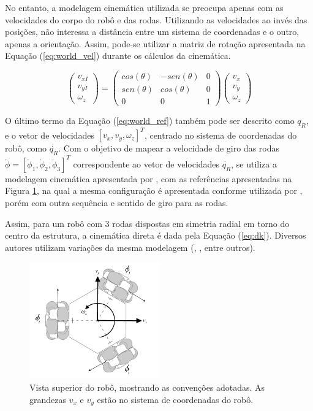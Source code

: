 No entanto, a modelagem cinemática utilizada se preocupa apenas com as velocidades do corpo do robô e das rodas. Utilizando as velocidades ao invés das posições, não interessa a distância entre um sistema de coordenadas e o outro, apenas a orientação. Assim, pode-se utilizar a matriz de rotação apresentada na Equação (\ref{eq:world_vel}) durante os cálculos da cinemática.

\begin{equation}
  \begin{pmatrix}
    v_{xI} \\
    v_{yI} \\
    \omega_z
  \end{pmatrix}
  =
  \begin{pmatrix}
    cos (\theta) & -sen (\theta) & 0 \\
    sen(\theta)  &  cos (\theta) & 0 \\
    0          & 0          & 1
  \end{pmatrix}
  \begin{pmatrix}
    v_x \\
    v_y \\
    \omega_z
  \end{pmatrix}
  \label{eq:world_vel}
\end{equation}

O último termo da Equação (\ref{eq:world_ref}) também pode ser descrito como $q_R$, e o vetor de velocidades $[v_x, v_y, \omega_z]^T$, centrado no sistema de coordenadas do robô, como $\dot{q_R}$. Com o objetivo de mapear a velocidade de giro das rodas $\dot{\phi} = [\dot{\phi}_1, \dot{\phi}_2, \dot{\phi}_3]^T$ correspondente ao vetor de velocidades $\dot{q_R}$, se utiliza a modelagem cinemática apresentada por \citet{siegwart2011introduction}, com as referências apresentadas na Figura \ref{fig:robo_vel}, na qual a mesma configuração é apresentada conforme utilizada por \citet{ritter2016modelagem}, porém com outra sequência e sentido de giro para as rodas.


Assim, para um robô com 3 rodas dispostas em simetria radial em torno do centro da estrutura, a cinemática direta é dada pela Equação (\ref{eq:dk}). Diversos autores utilizam variações da mesma modelagem (\citet{rojas2006holonomic}, \citet{pin1994new}, entre outros).

\begin{figure}[h!]
  \centering
  \includegraphics[width = 0.5\textwidth]{imagens/robot_vel4}
  \caption{Vista superior do robô, mostrando as convenções adotadas. As grandezas $v_x$ e $v_y$ estão no sistema de coordenadas do robô.}
  \label{fig:robo_vel}
\end{figure}


